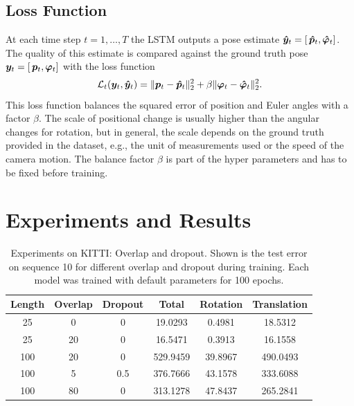 		\subsection{Loss Function}
			At each time step $t = 1, \dots, T$ the LSTM outputs a pose estimate 
			$\bm{\hat{y}}_t = \left[ \, \bm{\hat{p}}_t,  \bm{\hat{\varphi}}_t \right]$.
			The quality of this estimate is compared against the ground truth pose 
			$\bm{y}_t = \left[ \, \bm{p}_t,  \bm{\varphi}_t \right]$
			with the loss function
			\begin{equation}\label{eq:euler_pose_loss_function_t}
				\mathcal{L}_t(\bm{y}_t, \bm{\hat{y}}_t) = 
					\lVert \bm{p}_t - \bm{\hat{p}}_t \rVert_2^2 + 
					\beta \lVert \bm{\varphi}_t - \bm{\hat{\varphi}}_t \rVert_2^2.
			\end{equation}
			This loss function balances the squared error of position and Euler angles with a factor $\beta$.
			The scale of positional change is usually higher than the angular changes for rotation, but in general, the scale depends on the ground truth provided in the dataset, e.g., the unit of measurements used or the speed of the camera motion.
			The balance factor $\beta$ is part of the hyper parameters and has to be fixed before training. 
			
			
			
	\section{Experiments and Results}\label{sec:odometry-experiments-and-results}
	
		\begin{table}[tb]
			\small
			\begin{center}
				\begin{tabular}{|c|c|c||c|c|c|}
					\hline
					Length 	& Overlap 	& Dropout	& Total 	& Rotation	& Translation	\\ \hline
					25		& 0			& 0			& 19.0293	& 0.4981	& 18.5312		\\ \hline
					25		& 20		& 0			& 16.5471	& 0.3913	& 16.1558		\\ \hline
					100		& 20		& 0			& 529.9459	& 39.8967	& 490.0493		\\ \hline
					100 	& 5			& 0.5		& 376.7666	& 43.1578	& 333.6088		\\ \hline
					100		& 80		& 0			& 313.1278	& 47.8437	& 265.2841		\\ \hline
				\end{tabular}
			\end{center}
			\caption[Experiments on KITTI: Overlap and dropout]
					{Experiments on KITTI: Overlap and dropout. 
					 Shown is the test error on sequence 10 for different overlap and dropout during training.
					 Each model was trained with default parameters for 100 epochs.
					 \label{tbl:kitti-overlap-and-dropout}}
		\end{table}
		
